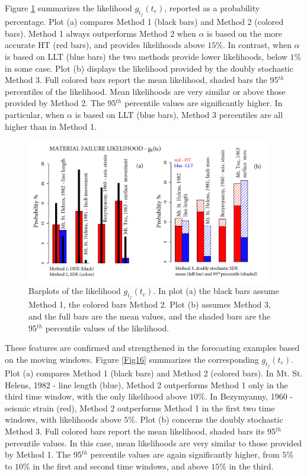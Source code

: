 \documentclass{article}
\begin{document}
Figure \ref{Fig15} summarizes the likelihood $g_{t_f}(t_e)$, reported as a probability percentage. Plot (a) compares Method 1 (black bars) and Method 2 (colored bars). Method 1 always outperforms Method 2 when $\alpha$ is based on the more accurate HT (red bars), and provides likelihoods above $15\%$. In contrast, when $\alpha$ is based on LLT (blue bars) the two methods provide lower likelihoods, below $1\%$ in some case. Plot (b) displays the likelihood provided by the doubly stochastic Method 3. Full colored bars report the mean likelihood, shaded bars the 95$^{th}$ percentiles of the likelihood. Mean likelihoods are very similar or above those provided by Method 2. The 95$^{th}$ percentile values are significantly higher. In particular, when $\alpha$ is based on LLT (blue bars), Method 3 percentiles are all higher than in Method 1.
\begin{figure}[H]
\centering
\includegraphics[width=0.95\textwidth]{Fig15_plus.png}
\caption{Barplots of the likelihood $g_{t_f}(t_e)$. In plot (a) the black bars assume Method 1, the colored bars Method 2. Plot (b) assumes Method 3, and the full bars are the mean values, and the shaded bars are the 95$^{th}$ percentile values of the likelihood.}
\label{Fig15}
\end{figure}
These features are confirmed and strengthened in the forecasting examples based on the moving windows. Figure \ref{Fig16} summarizes the corresponding $g_{t_f}(t_e)$. Plot (a) compares Method 1 (black bars) and Method 2 (colored bars). In Mt. St. Helens, 1982 - line length (blue), Method 2 outperforms Method 1 only in the third time window, with the only likelihood above $10\%$. In Bezymyanny, 1960 - seismic strain (red), Method 2 outperforms Method 1 in the first two time windows, with likelihoods above $5\%$. Plot (b) concerns the doubly stochastic Method 3. Full colored bars report the mean likelihood, shaded bars its 95$^{th}$ percentile values. In this case, mean likelihoods are very similar to those provided by Method 1. The 95$^{th}$ percentile values are again significantly higher, from $5\%$ to $10\%$ in the first and second time windows, and above $15\%$ in the third.
\end{document}
